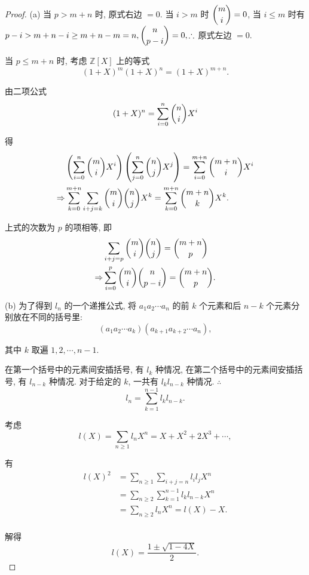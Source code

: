 \documentclass[UTF8]{ctexart}
\begin{document}
\begin{proof}
    (a) 当 $p>m+n$ 时, 原式右边 $=0$. 当 $i>m$ 时 $\dbinom{m}{i}=0$, 当 $i\leq m$ 时有 $p-i>m+n-i\geq m+n-m=n,\dbinom{n}{p-i}=0,\therefore$ 原式左边 $=0$.

    当 $p\leq m+n$ 时, 考虑 $\mathbb{Z}[X]$ 上的等式
    \[(1+X)^m(1+X)^n=(1+X)^{m+n}.\]

    由二项公式
    \[(1+X)^n=\sum\limits_{i=0}^n\dbinom{n}{i}X^i\]

    得
    \begin{align*}
        & \left(\sum\limits_{i=0}^n\dbinom{m}{i}X^i\right)\left(\sum\limits_{j=0}^n\dbinom{n}{j}X^j\right)=\sum\limits_{i=0}^{m+n}\dbinom{m+n}{i}X^i \\
        \Rightarrow & \sum\limits_{k=0}^{m+n}\sum\limits_{i+j=k}\dbinom{m}{i}\dbinom{n}{j}X^k=\sum\limits_{k=0}^{m+n}\dbinom{m+n}{k}X^k. \\
    \end{align*}

    上式的次数为 $p$ 的项相等, 即
    \begin{align*}
        & \sum\limits_{i+j=p}\dbinom{m}{i}\dbinom{n}{j}=\dbinom{m+n}{p} \\
        \Rightarrow & \sum\limits_{i=0}^p\dbinom{m}{i}\dbinom{n}{p-i}=\dbinom{m+n}{p}. \\
    \end{align*}

    (b) 为了得到 $l_n$ 的一个递推公式, 将 $a_1a_2\cdots a_n$ 的前 $k$ 个元素和后 $n-k$ 个元素分别放在不同的括号里:
    \[(a_1a_2\cdots a_k)(a_{k+1}a_{k+2}\cdots a_n),\]

    其中 $k$ 取遍 $1,2,\cdots,n-1$.

    在第一个括号中的元素间安插括号, 有 $l_k$ 种情况, 在第二个括号中的元素间安插括号, 有 $l_{n-k}$ 种情况. 对于给定的 $k$, 一共有 $l_kl_{n-k}$ 种情况. $\therefore$
    \[l_n=\sum\limits_{k=1}^{n-1}l_kl_{n-k}.\]

    考虑
    \[l(X)=\sum\limits_{n\geq1}l_nX^n=X+X^2+2X^3+\cdots,\]

    有
    \begin{align*}
        l(X)^2 & =\sum\limits_{n\geq1}\sum\limits_{i+j=n}l_il_jX^n \\
        & =\sum\limits_{n\geq2}\sum\limits_{k=1}^{n-1}l_kl_{n-k}X^n \\
        & =\sum\limits_{n\geq2}l_nX^n=l(X)-X. \\
    \end{align*}

    解得
    \[l(X)=\dfrac{1\pm\sqrt{1-4X}}{2}.\]


\end{proof}
\end{document}
